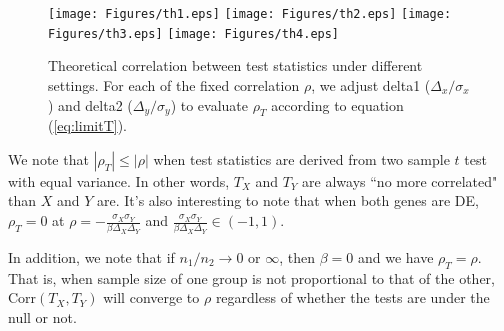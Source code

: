 \documentclass[12pt, a4paper]{article}
\newtheorem{corollary}{corollary}
\newcommand{\cor}{\text{Corr}}
\begin{document}
			\begin{figure}[!ht]
				\centering
				\texttt{[image: Figures/th1.eps]}
				\texttt{[image: Figures/th2.eps]}
				\texttt{[image: Figures/th3.eps]}
				\texttt{[image: Figures/th4.eps]}
				\caption{Theoretical correlation between test statistics under different settings. 
				For each of the fixed correlation $\rho$, we adjust delta1 ($\Delta_x/\sigma_x$) 
				and delta2 ($\Delta_y/\sigma_y$) to evaluate $\rho_T$ according to equation 
				(\ref{eq:limitT}).}
				\label{fig:th}
			\end{figure}
	We note that $|\rho_T| \leq |\rho|$ when test statistics are derived from two sample $t$ test 
	with equal variance. In other words, $T_X$ and $T_Y$ are always ``no more correlated" than $X$ 
	and $Y$ are. It's also interesting to note that when both genes are DE, $\rho_T=0$ at $\rho 
	=-\frac{\sigma_X\sigma_Y}{\beta\Delta_X\Delta_Y} $ and 
	$\frac{\sigma_X\sigma_Y}{\beta\Delta_X\Delta_Y} \in (-1, 1)$.
			
	 In addition, we note that if $n_1/n_2 \rightarrow 0$ or $\infty$, then $\beta = 0$ and we have $\rho_T = \rho$. That is, when sample size of one group is not proportional to that of the other, $\cor(T_X, T_Y)$ will converge to $\rho$ regardless of whether the tests are under the null or not. 	
\end{document}
